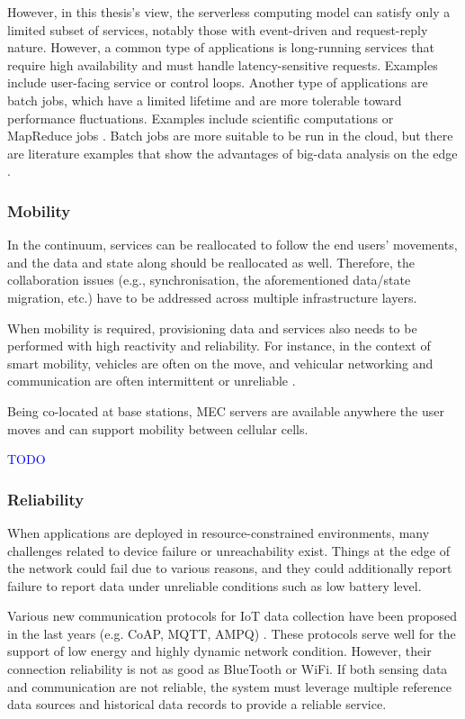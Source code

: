 \documentclass{ieeeaccess}
\begin{document}
However, in this thesis's view, the serverless computing model can satisfy only a limited subset of services, notably those with event-driven and request-reply nature. However, a common type of applications is long-running services that require high availability and must handle latency-sensitive requests. Examples include user-facing service or control loops. Another type of applications are batch jobs, which have a limited lifetime and are more tolerable toward performance fluctuations. Examples include scientific computations or MapReduce jobs \cite{map-reduce}. Batch jobs are more suitable to be run in the cloud, but there are literature examples that show the advantages of big-data analysis on the edge \cite{data-analytics-iot}.

\subsubsection{Mobility}

In the continuum, services can be reallocated to follow the end users' movements, and the data and state along should be reallocated as well. Therefore, the collaboration issues (e.g., synchronisation, the aforementioned data/state migration, etc.) have to be addressed across multiple infrastructure layers.

When mobility is required, provisioning data and services also needs to be performed with high reactivity and reliability. For instance, in the context of smart mobility, vehicles are often on the move, and vehicular networking and communication are often intermittent or unreliable \cite{vehicular-data-cloud}.

Being co-located at base stations, MEC servers are available anywhere the user moves and can support mobility between cellular cells.

\textcolor{blue}{TODO}

\subsubsection{Reliability}

When applications are deployed in resource-constrained environments, many challenges related to device failure or unreachability exist. Things at the edge of the network could fail due to various reasons, and they could additionally report failure to report data under unreliable conditions such as low battery level.

Various new communication protocols for IoT data collection have been proposed in the last years (e.g. CoAP, MQTT, AMPQ) \cite{mqtt-coap-amqp-http}. These protocols serve well for the support of low energy and highly dynamic network condition. However, their connection reliability is not as good as BlueTooth or WiFi. If both sensing data and communication are not reliable, the system must leverage multiple reference data sources and historical data records to provide a reliable service.
\end{document}
